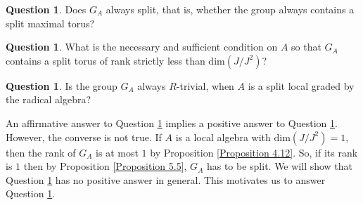 \documentclass[12pt]{amsart}
\theoremstyle{definition}
\newtheorem{question}[theorem]{Question}
\numberwithin{equation}{section}
\begin{document}
 
\vskip2mm

\begin{question}\label{Question 5.6}
Does $G_A$ always split, that is, whether the group always contains a split maximal torus?
\end{question}

\vskip2mm

\begin{question}\label{Question 5.7}
What is the necessary and sufficient condition on $A$ so that $G_A$ contains a split torus of rank strictly less than $\text{dim}(J/J^2)$?
\end{question}

\vskip2mm

\begin{question}\label{Question 5.8}
Is the group $G_A$ always $R$-trivial, when $A$ is a split local graded by the radical algebra?
\end{question}


\vskip2mm
\noindent
An affirmative answer to Question \ref{Question 5.6} implies a positive answer to Question \ref{Question 5.8}. However, the converse is not true. If $A$ is a local algebra with $\text{dim}(J/J^2) =1$, then the rank of $G_A$ is at most $1$ by Proposition \ref{Proposition 4.12}. So, if its rank is $1$ then by Proposition \ref{Proposition 5.5}, $G_A$ has to be split. We will show that Question \ref{Question 5.6} has no positive answer in general. This motivates us to answer Question \ref{Question 5.7}.

\vskip2mm
\end{document}
